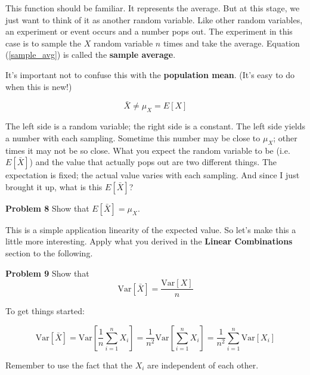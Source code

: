 \documentclass[]{article}
\begin{document}
This function should be familiar.  It represents the average.
But at this stage, we just want to think of it as another
random variable.  Like other random variables, an experiment
or event occurs and a number pops out.  The experiment in this
case is to sample the $X$ random variable $n$ times and take
the average.  Equation (\ref{sample_avg}) is called the
\textbf{sample average}.

It's important not to confuse this with the
\textbf{population mean}. (It's easy to do when this is new!)

$$
\bar{X} \ne \mu_X = E[X]
$$

The left side is a random variable; the right side is a
constant.  The left side yields a number with each sampling.
Sometime this number may be close to $\mu_X$; other times it
may not be so close.  What you expect the random variable to
be (i.e. $E[\bar{X}]$) and the value that actually pops out
are two different things.  The expectation is fixed; the actual
value varies with each sampling.  And since I just brought it
up, what is this $E[\bar{X}]$?

\textbf{Problem 8} Show that $E[\bar{X}] = \mu_X$.

This is a simple application linearity of the expected
value.  So let's make this a little more interesting.  Apply
what you derived in the \textbf{Linear Combinations} section
to the following.

\textbf{Problem 9} Show that
\begin{equation} \label{sample_var}
\mbox{Var}[\bar{X}] = \frac{\mbox{Var}[X]}{n}
\end{equation}

To get things started:

$$
\mbox{Var}[\bar{X}] = \mbox{Var} \left[ \frac{1}{n}
     \sum_{i=1}^n X_i \right]
  =  \frac{1}{n^2} \mbox{Var} \left[\sum_{i=1}^n X_i \right]
  =  \frac{1}{n^2} \sum_{i=1}^n \mbox{Var}[X_i]
$$

Remember to use the fact that the $X_i$ are independent
of each other.
\end{document}
